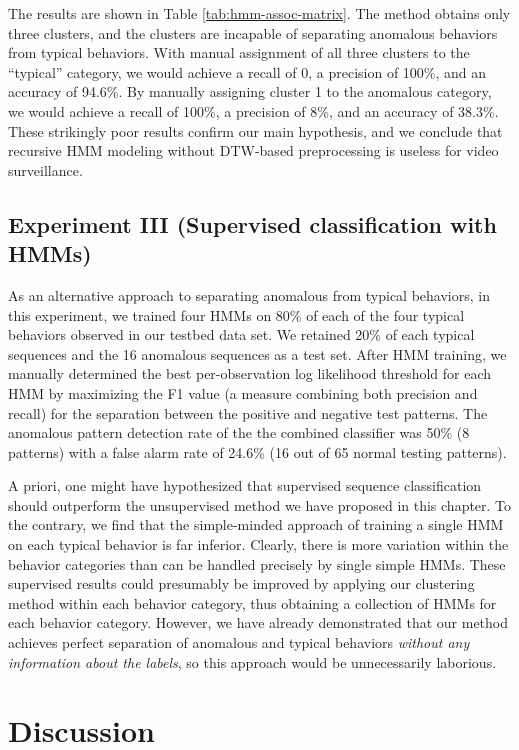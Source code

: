 The results are shown in Table \ref{tab:hmm-assoc-matrix}. The method
obtains only three clusters, and the clusters are incapable of
separating anomalous behaviors from typical behaviors.  With manual
assignment of all three clusters to the ``typical'' category, we would
achieve a recall of 0, a precision of 100\%, and an accuracy of
94.6\%.  By manually assigning cluster 1 to the anomalous category, we
would achieve a recall of 100\%, a precision of 8\%, and an accuracy
of 38.3\%.  These strikingly poor results confirm our main hypothesis,
and we conclude that recursive HMM modeling without DTW-based
preprocessing is useless for video surveillance.

\subsection{Experiment III (Supervised classification with HMMs)} 

As an alternative approach to separating anomalous from typical
behaviors, in this experiment, we trained four HMMs on 80\% of each of
the four typical behaviors observed in our testbed data set.  We
retained 20\% of each typical sequences and the 16 anomalous sequences
as a test set. After HMM training, we manually determined the best
per-observation log likelihood threshold for each HMM by maximizing
the F1 value (a measure combining both precision and recall) for the
separation between the positive and negative test patterns.  The
anomalous pattern detection rate of the the combined classifier was
50\% (8 patterns) with a false alarm rate of 24.6\% (16 out of 65
normal testing patterns).

A priori, one might have hypothesized that supervised sequence
classification should outperform the unsupervised method we have
proposed in this chapter.  To the contrary, we find that the
simple-minded approach of training a single HMM on each typical
behavior is far inferior.  Clearly, there is more variation within the
behavior categories than can be handled precisely by single simple
HMMs.  These supervised results could presumably be improved by
applying our clustering method within each behavior category, thus
obtaining a collection of HMMs for each behavior category.  However,
we have already demonstrated that our method achieves perfect
separation of anomalous and typical behaviors \textit{without any
information about the labels}, so this approach would be unnecessarily
laborious.

\section{Discussion}
\label{sec:clustering-discussion}

